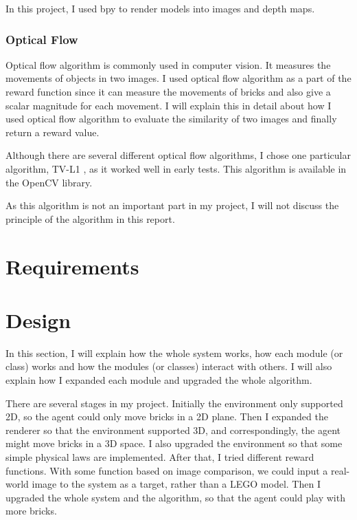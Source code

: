 \documentclass[a4paper]{article}
\begin{document}
                In this project, I used bpy to render models into images and depth maps.
            
            \subsubsection{Optical Flow}
                Optical flow algorithm is commonly used in computer vision. It measures the movements of objects in two images. I used optical flow algorithm as a part of the reward function since it can measure the movements of bricks and also give a scalar magnitude for each movement. I will explain this in detail about how I used optical flow algorithm to evaluate the similarity of two images and finally return a reward value.
                
                Although there are several different optical flow algorithms, I chose one particular algorithm, TV-L1 \cite{tvl1}, as it worked well in early tests. This algorithm is available in the OpenCV library.
                
                As this algorithm is not an important part in my project, I will not discuss the principle of the algorithm in this report.
            
    \section{Requirements}
        \newpage
    \section{Design}
    
        In this section, I will explain how the whole system works, how each module (or class) works and how the modules (or classes) interact with others. I will also explain how I expanded each module and upgraded the whole algorithm. 
        
        There are several stages in my project. 
        Initially the environment only supported 2D, so the agent could only move bricks in a 2D plane. Then I expanded the renderer so that the environment supported 3D, and correspondingly, the agent might move bricks in a 3D space. I also upgraded the environment so that some simple physical laws are implemented. After that, I tried different reward functions. With some function based on image comparison, we could input a real-world image to the system as a target, rather than a LEGO model. Then I upgraded the whole system and the algorithm, so that the agent could play with more bricks.
               
\end{document}
